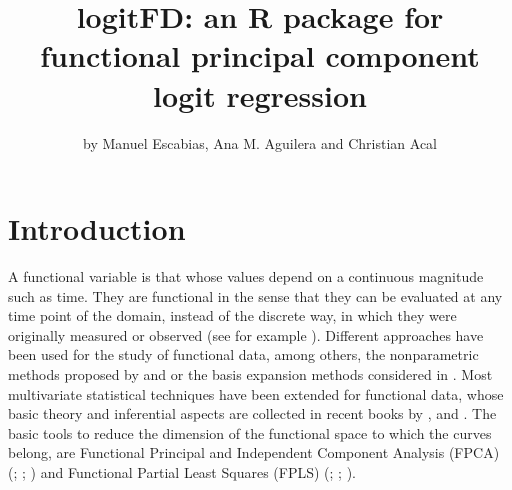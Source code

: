 \title{logitFD: an R package for functional principal component logit regression}
\author{by Manuel Escabias, Ana M. Aguilera and Christian Acal}

\maketitle


\section{Introduction}

A functional variable is that whose values depend on a continuous magnitude such as time. They are functional in the sense that they can be evaluated at any time point of the domain, instead of the discrete way, in which they were originally measured or observed (see for example \citealp{Ramsay05}). Different approaches have been used for the study of functional data, among others, the nonparametric methods proposed by \cite{Muller05} and \cite{FerratyVieu} or the basis expansion methods considered in \cite{Ramsay05}. Most multivariate statistical techniques have been extended for functional data, whose basic theory and inferential aspects are collected in recent books by \cite{Horvath}, \cite{Zhang2014} and \cite{Kokoszka2018}. The basic tools to reduce the dimension of the functional space to which the curves belong, are Functional Principal and Independent Component Analysis (FPCA) (\citealp{Ramsay05}; \citealp{Acal20}; \citealp{Vidal2021}) and Functional Partial Least Squares (FPLS) (\citealp{Preda2005}; \citealp{Aguilera2010}; \citealp{Aguilera2016}).


